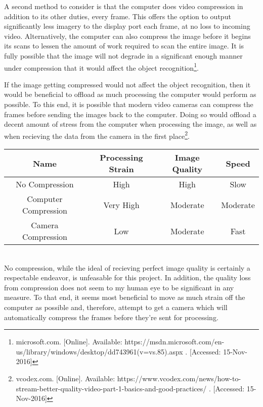 \documentclass[letterpaper,10pt,onecolumn,draftclsnofoot]{IEEEtran}
\begin{document}
A second method to consider is that the computer does video compression in addition to its other duties, every frame.  This offers the option to output significantly less imagery to the display port each frame, at no loss to incoming video.  Alternatively, the computer can also compress the image before it begins its scans to lessen the amount of work required to scan the entire image.  It is fully possible that the image will not degrade in a significant enough manner under compression that it would affect the object recognition\footnote{microsoft.com. [Online]. Available: https://msdn.microsoft.com/en-us/library/windows/desktop/dd743961(v=vs.85).aspx . [Accessed: 15-Nov-2016] }. 

If the image getting compressed would not affect the object recognition, then it would be beneficial to offload as much processing the computer would perform as possible.  To this end, it is possible that modern video cameras can compress the frames before sending the images back to the computer.  Doing so would offload a decent amount of stress from the computer when processing the image, as well as when recieving the data from the camera in the first place\footnote{vcodex.com. [Online]. Available: https://www.vcodex.com/news/how-to-stream-better-quality-video-part-1-basics-and-good-practices/ . [Accessed: 15-Nov-2016] }. \\

\begin{tabular}{|c|c|c|c|}
  \hline
  \textbf{Name} & \textbf{Processing Strain} & \textbf{Image Quality} & \textbf{Speed} \\
  \hline
  No Compression & High & High & Slow \\ 
  \hline
  Computer Compression & Very High & Moderate & Moderate  \\ 
  \hline
  Camera Compression & Low & Moderate & Fast \\ 
  \hline
\end{tabular} \\

No compression, while the ideal of recieving perfect image quality is certainly a respectable endeavor, is unfeasable for this project.  In addition, the quality loss from compression does not seem to my human eye to be significant in any measure.  To that end, it seems most beneficial to move as much strain off the computer as possible and, therefore, attempt to get a camera which will automatically compress the frames before they're sent for processing.
\end{document}
